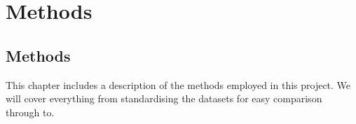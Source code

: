 \part{Methods}
\label{Chap:Methods}

\chapter{Methods}
This chapter includes a description of the methods employed in this project. We will cover everything from standardising the datasets for easy comparison through to.

% 

% 

% 

% 

% 